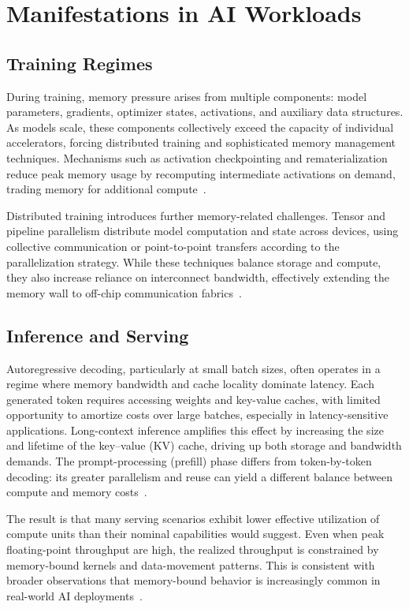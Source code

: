 \documentclass[conference]{IEEEtran}
\begin{document}
\section{Manifestations in AI Workloads}
\label{sec:manifestations}

\subsection{Training Regimes}

During training, memory pressure arises from multiple components: model parameters, gradients, optimizer states, activations, and auxiliary data structures. As models scale, these components collectively exceed the capacity of individual accelerators, forcing distributed training and sophisticated memory management techniques. Mechanisms such as activation checkpointing and rematerialization reduce peak memory usage by recomputing intermediate activations on demand, trading memory for additional compute~\cite{gholami2024ai}.

Distributed training introduces further memory-related challenges. Tensor and pipeline parallelism distribute model computation and state across devices, using collective communication or point-to-point transfers according to the parallelization strategy. While these techniques balance storage and compute, they also increase reliance on interconnect bandwidth, effectively extending the memory wall to off-chip communication fabrics~\cite{gholami2024ai}.

\subsection{Inference and Serving}

Autoregressive decoding, particularly at small batch sizes, often operates in a regime where memory bandwidth and cache locality dominate latency. Each generated token requires accessing weights and key-value caches, with limited opportunity to amortize costs over large batches, especially in latency-sensitive applications. Long-context inference amplifies this effect by increasing the size and lifetime of the key--value (KV) cache, driving up both storage and bandwidth demands. The prompt-processing (prefill) phase differs from token-by-token decoding: its greater parallelism and reuse can yield a different balance between compute and memory costs~\cite{gholami2024ai}.

The result is that many serving scenarios exhibit lower effective utilization of compute units than their nominal capabilities would suggest. Even when peak floating-point throughput are high, the realized throughput is constrained by memory-bound kernels and data-movement patterns. This is consistent with broader observations that memory-bound behavior is increasingly common in real-world AI deployments~\cite{gholami2024ai}.
\end{document}

